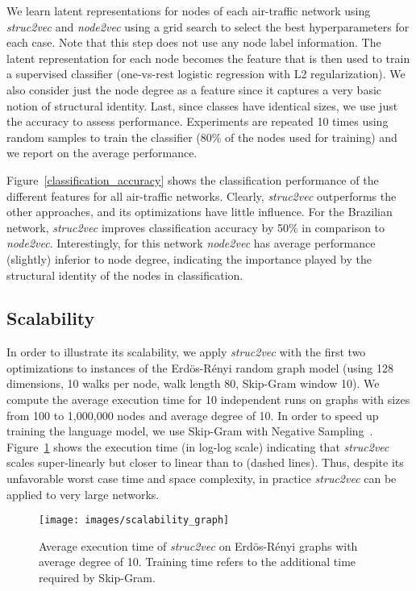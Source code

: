 \documentclass[sigconf]{acmart}
\begin{document}
We learn latent representations for nodes of each air-traffic network using \textit{struc2vec} and \textit{node2vec} using a grid search to select the best hyperparameters for each case. Note that this step does not use any node label information. The latent representation for each node becomes the feature that is then used to train a supervised classifier (one-vs-rest logistic regression with L2 regularization). We also consider just the node degree as a feature since it captures a very basic notion of structural identity. Last, since classes have identical sizes, we use just the accuracy to assess performance. Experiments are repeated 10 times using random samples to train the classifier (80\% of the nodes used for training) and we report on the average performance.

Figure~\ref{classification_accuracy} shows the classification performance of the different features for all air-traffic networks. Clearly, \textit{struc2vec} outperforms the other approaches, and its optimizations have little influence. For the Brazilian network, \textit{struc2vec} improves classification accuracy by 50\% in comparison to \textit{node2vec}. Interestingly, for this network \textit{node2vec} has average performance (slightly) inferior to node degree, indicating the importance played by the structural identity of the nodes in classification. 

 \subsection{Scalability}
\label{sec:scalability}

In order to illustrate its scalability, we apply \textit{struc2vec} with the first two optimizations to instances of the Erd\"os-R\'enyi random graph model (using 128 dimensions, 10 walks per node, walk length 80, Skip-Gram window 10). We compute the average execution time for 10 independent runs on graphs with sizes from 100 to 1,000,000 nodes and average degree of 10. In order to speed up training the language model, we use Skip-Gram with Negative Sampling~\cite{word2vecmiko}. Figure~\ref{scalability_figure} shows the execution time (in log-log scale) indicating that \textit{struc2vec} scales super-linearly but closer to linear than to  (dashed lines). Thus, despite its unfavorable worst case time and space complexity, in practice \textit{struc2vec} can be applied to very large networks.

\begin{figure}[h]
\centering
\texttt{[image: images/scalability\_graph]} 
\caption{Average execution time of \textit{struc2vec} on Erd\"os-R\'enyi graphs with average degree of 10. Training time refers to the additional time required by Skip-Gram.}
\label{scalability_figure}
\end{figure}
\end{document}
